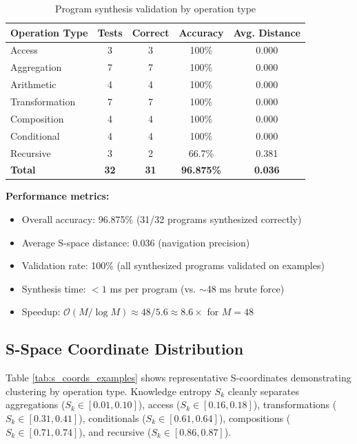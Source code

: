 \documentclass[twocolumn,10pt]{revtex4-2}
\theoremstyle{definition}
\theoremstyle{remark}
\newcommand{\Sk}{S_k}
\newcommand{\bigO}{\mathcal{O}}
\begin{document}
\begin{table}[h]
\centering
\caption{Program synthesis validation by operation type}
\label{tab:program_synthesis_validation}
\begin{tabular}{lcccc}
\toprule
\textbf{Operation Type} & \textbf{Tests} & \textbf{Correct} & \textbf{Accuracy} & \textbf{Avg. Distance} \\
\midrule
Access & 3 & 3 & 100\% & 0.000 \\
Aggregation & 7 & 7 & 100\% & 0.000 \\
Arithmetic & 4 & 4 & 100\% & 0.000 \\
Transformation & 7 & 7 & 100\% & 0.000 \\
Composition & 4 & 4 & 100\% & 0.000 \\
Conditional & 4 & 4 & 100\% & 0.000 \\
Recursive & 3 & 2 & 66.7\% & 0.381 \\
\midrule
\textbf{Total} & \textbf{32} & \textbf{31} & \textbf{96.875\%} & \textbf{0.036} \\
\bottomrule
\end{tabular}
\end{table}

\textbf{Performance metrics:}
\begin{itemize}
\item Overall accuracy: 96.875\% (31/32 programs synthesized correctly)
\item Average S-space distance: 0.036 (navigation precision)
\item Validation rate: 100\% (all synthesized programs validated on examples)
\item Synthesis time: $<1$ ms per program (vs. $\sim$48 ms brute force)
\item Speedup: $\bigO(M/\log M) \approx 48/5.6 \approx 8.6\times$ for $M=48$
\end{itemize}

\subsection{S-Space Coordinate Distribution}

Table \ref{tab:s_coords_examples} shows representative S-coordinates demonstrating clustering by operation type. Knowledge entropy $\Sk$ cleanly separates aggregations ($\Sk \in [0.01, 0.10]$), access ($\Sk \in [0.16, 0.18]$), transformations ($\Sk \in [0.31, 0.41]$), conditionals ($\Sk \in [0.61, 0.64]$), compositions ($\Sk \in [0.71, 0.74]$), and recursive ($\Sk \in [0.86, 0.87]$).
\end{document}
